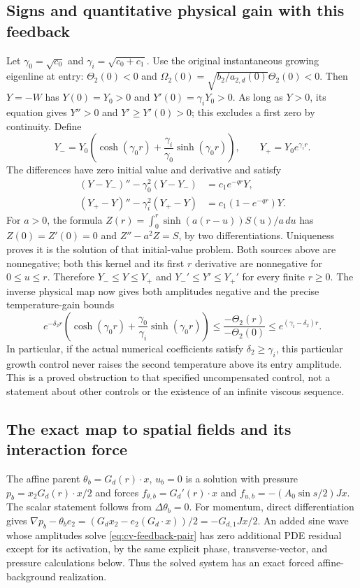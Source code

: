 \subsection{Signs and quantitative physical gain with this feedback}

Let $\gamma_0=\sqrt{c_0}$ and $\gamma_i=\sqrt{c_0+c_1}$.
Use the original instantaneous growing eigenline at entry:
$\Theta_2(0)<0$ and
$\Omega_2(0)=\sqrt{b_2/a_{2,d}(0)}\Theta_2(0)<0$.
Then $Y=-W$ has $Y(0)=Y_0>0$ and
$Y'(0)=\gamma_iY_0>0$.
As long as $Y>0$, its equation gives $Y''>0$ and
$Y'\geq Y'(0)>0$; this excludes a first zero by continuity.
Define
\[
 Y_-=Y_0\left(\cosh(\gamma_0r)
          +\frac{\gamma_i}{\gamma_0}\sinh(\gamma_0r)\right),
 \qquad Y_+=Y_0e^{\gamma_i r}.
\]
The differences have zero initial value and derivative and satisfy
\begin{align*}
 (Y-Y_-)''-\gamma_0^2(Y-Y_-)&=c_1e^{-qr}Y,\\
 (Y_+-Y)''-\gamma_i^2(Y_+-Y)&=c_1(1-e^{-qr})Y.
\end{align*}
For $a>0$, the formula
$Z(r)=\int_0^r\sinh(a(r-u))S(u)/a\,du$ has
$Z(0)=Z'(0)=0$ and $Z''-a^2Z=S$, by two differentiations.
Uniqueness proves it is the solution of that initial-value problem.
Both sources above are nonnegative; both this kernel and its first
$r$ derivative are nonnegative for $0\leq u\leq r$.
Therefore $Y_-\leq Y\leq Y_+$ and
$Y_-'\leq Y'\leq Y_+'$ for every finite $r\geq0$.
The inverse physical map now gives both amplitudes negative and the
precise temperature-gain bounds
\begin{equation}
 e^{-\delta_2r}\left(\cosh(\gamma_0r)
       +\frac{\gamma_0}{\gamma_i}\sinh(\gamma_0r)\right)
 \leq\frac{-\Theta_2(r)}{-\Theta_2(0)}
 \leq e^{(\gamma_i-\delta_2)r}.
 \label{eq:cv-feedback-physical-gain}
\end{equation}
In particular, if the actual numerical coefficients satisfy
$\delta_2\geq\gamma_i$, this particular growth control never raises
the second temperature above its entry amplitude. This is a proved
obstruction to that specified uncompensated control, not a statement
about other controls or the existence of an infinite viscous sequence.

\subsection{The exact map to spatial fields and its interaction force}

The affine parent $\theta_b=G_d(r)\cdot x$, $u_b=0$ is a solution
with pressure $p_b=x_2G_d(r)\cdot x/2$ and forces
$f_{\theta,b}=G_d'(r)\cdot x$ and
$f_{u,b}=-(A_0\sin s/2)Jx$.
The scalar statement follows from $\Delta\theta_b=0$.
For momentum, direct differentiation gives
$\nabla p_b-\theta_be_2=(G_dx_2-e_2(G_d\cdot x))/2
=-G_{d,1}Jx/2$.
An added sine wave whose amplitudes solve
\eqref{eq:cv-feedback-pair} has zero additional PDE residual except
for its activation, by the same explicit phase, transverse-vector,
and pressure calculations below. Thus the solved system has an exact
forced affine-background realization.

